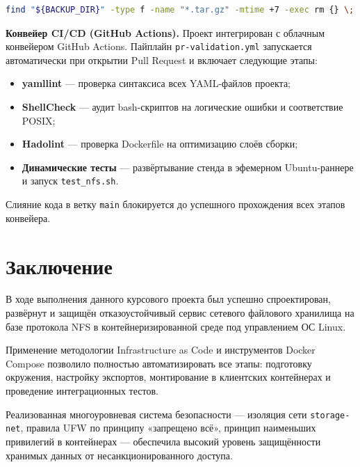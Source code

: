 \documentclass[14pt,a4paper]{extarticle}
\begin{document}
	\begin{lstlisting}[language=bash, caption={Ротация архивов в backup.sh}]
		find "${BACKUP_DIR}" -type f -name "*.tar.gz" -mtime +7 -exec rm {} \;
	\end{lstlisting}
	
	\textbf{Конвейер CI/CD (GitHub Actions).}
	Проект интегрирован с облачным конвейером GitHub Actions. Пайплайн
	\texttt{pr-validation.yml} запускается автоматически при открытии Pull Request и
	включает следующие этапы:
	
	\begin{itemize}
		\item \textbf{yamllint} --- проверка синтаксиса всех YAML-файлов проекта;
		\item \textbf{ShellCheck} --- аудит bash-скриптов на логические ошибки и соответствие
		POSIX;
		\item \textbf{Hadolint} --- проверка Dockerfile на оптимизацию слоёв сборки;
		\item \textbf{Динамические тесты} --- развёртывание стенда в эфемерном
		Ubuntu-раннере и запуск \texttt{test\_nfs.sh}.
	\end{itemize}
	
	Слияние кода в ветку \texttt{main} блокируется до успешного прохождения всех этапов
	конвейера.
	
	\newpage
	
	\section*{Заключение}
	
	В ходе выполнения данного курсового проекта был успешно спроектирован, развёрнут и
	защищён отказоустойчивый сервис сетевого файлового хранилища на базе протокола NFS в
	контейнеризированной среде под управлением ОС Linux.
	
	Применение методологии Infrastructure as Code и инструментов Docker Compose позволило
	полностью автоматизировать все этапы: подготовку окружения, настройку экспортов,
	монтирование в клиентских контейнерах и проведение интеграционных тестов.
	
	Реализованная многоуровневая система безопасности --- изоляция сети
	\texttt{storage-net}, правила UFW по принципу «запрещено всё», принцип наименьших
	привилегий в контейнерах --- обеспечила высокий уровень защищённости хранимых данных от
	несанкционированного доступа.
	
\end{document}
